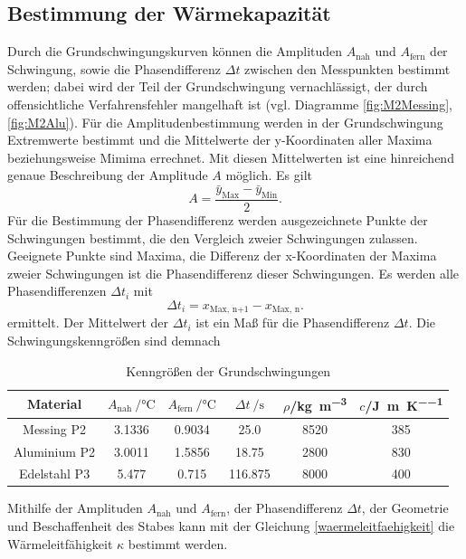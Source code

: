 \subsection{Bestimmung der Wärmekapazität}
Durch die Grundschwingungskurven können die Amplituden $A_{\text{nah}}$ und $A_{\text{fern}}$ der Schwingung, sowie die Phasendifferenz $\Delta t$ zwischen den Messpunkten bestimmt werden; 
dabei wird der Teil der Grundschwingung vernachlässigt, der durch offensichtliche Verfahrensfehler mangelhaft ist
(vgl. Diagramme \ref{fig:M2Messing}, \ref{fig:M2Alu}).
Für die Amplitudenbestimmung werden in der Grundschwingung Extremwerte bestimmt und die Mittelwerte der y-Koordinaten aller Maxima beziehungsweise Mimima errechnet.
Mit diesen Mittelwerten ist eine hinreichend genaue Beschreibung der Amplitude $A$ möglich.
Es gilt
\begin{equation}
	A = \frac{\bar{y}_{\text{Max}}-\bar{y}_{\text{Min}}}{2}.
\end{equation}
Für die Bestimmung der Phasendifferenz werden ausgezeichnete Punkte der Schwingungen bestimmt, die den Vergleich zweier Schwingungen zulassen. 
Geeignete Punkte sind Maxima, die Differenz der x-Koordinaten der Maxima zweier Schwingungen ist die Phasendifferenz dieser Schwingungen.
Es werden alle Phasendifferenzen $\Delta{t_i}$ mit
\begin{equation}
	\Delta{t_i} = {x}_{\text{Max, n+1}}-{x}_{\text{Max, n}}.
\end{equation}
ermittelt.
Der Mittelwert der $\Delta{t_i}$ ist ein Maß für die Phasendifferenz $\Delta{t}$. 
Die Schwingungskenngrößen sind demnach
\begin{table}[htbp]
	\centering
	\begin{tabular}{c S[table-format=1.5] S[table-format=1.5] S[table-format=3.3] c c}
		\toprule
		{Material}&{$A_\text{nah} \:/\si{\degreeCelsius}$}&{$A_\text{fern}\:/\si{\degreeCelsius}$}&{$\Delta{t}\:/\si{\second}$}&{$\rho$\:/\:\si{\kilo\gram\per\meter\cubed}}&{$c$\:/\:\si{\joule\per\meter\per\kelvin}}\\
		\midrule
		{Messing P2}& 	{3.1336}&{0.9034}&	{25.0}&		{8520}&{385}\\
		{Aluminium P2}&	{3.0011}&{1.5856}&	{18.75}&	{2800}&{830}\\
		{Edelstahl P3}&	{5.477}&{0.715}&	{116.875}&	{8000}&{400}\\
		\bottomrule
	\end{tabular}
	\caption{Kenngrößen der Grundschwingungen}
	\label{tab:kappazutaten}
\end{table}
Mithilfe der Amplituden $A_{\text{nah}}$ und $A_{\text{fern}}$, der Phasendifferenz $\Delta t$, der Geometrie und Beschaffenheit des Stabes kann mit der Gleichung \eqref{waermeleitfaehigkeit} die Wärmeleitfähigkeit $\kappa$ bestimmt werden.
